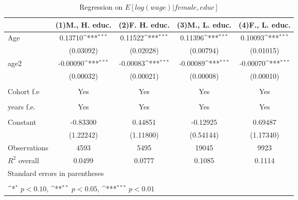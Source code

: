 \begin{table}[htbp]\centering
\def\sym#1{\ifmmode^{#1}\else\(^{#1}\)\fi}
\caption{Regression on \(E[log(wage)|female,educ]\) \label{Tab:reg2}}
\begin{tabular}{l*{4}{c}}
\toprule
                    &\multicolumn{1}{c}{(1)M., H. educ.\label{Reg:2_H_M}}         &\multicolumn{1}{c}{(2)F. H. educ.\label{Reg:2_H_F} }        &\multicolumn{1}{c}{(3)M., L. educ.\label{Reg:2_L_M}}         &\multicolumn{1}{c}{(4)F., L. educ.\label{Reg:2_L_F}}         \\
\midrule
Age                 &     0.13710\sym{***}&     0.11522\sym{***}&     0.11396\sym{***}&     0.10093\sym{***}\\
                    &   (0.03092)         &   (0.02028)         &   (0.00794)         &   (0.01015)         \\
\addlinespace
age2                &    -0.00090\sym{***}&    -0.00083\sym{***}&    -0.00089\sym{***}&    -0.00070\sym{***}\\
                    &   (0.00032)         &   (0.00021)         &   (0.00008)         &   (0.00010)         \\

\\
Cohort f.e           &       Yes        &      Yes &       Yes        &      Yes \\
                            \\
\addlinespace
years f.e.            &       Yes         &       Yes   &       Yes        &      Yes       \\
                           \\
\addlinespace

Constant            &    -0.83300         &     0.44851         &    -0.12925         &     0.69487         \\
                    &   (1.22242)         &   (1.11800)         &   (0.54144)         &   (1.17340)         \\
\midrule
Observations        &        4593         &        5495         &       19045         &        9923         \\
$R^2$ overall       &   0.0499 &0.0777 &0.1085&0.1114\\
\bottomrule
\multicolumn{5}{l}{\footnotesize Standard errors in parentheses}\\
\multicolumn{5}{l}{\footnotesize }\\
\multicolumn{5}{l}{\footnotesize \sym{*} \(p<0.10\), \sym{**} \(p<0.05\), \sym{***} \(p<0.01\)}\\
\end{tabular}
\end{table}
